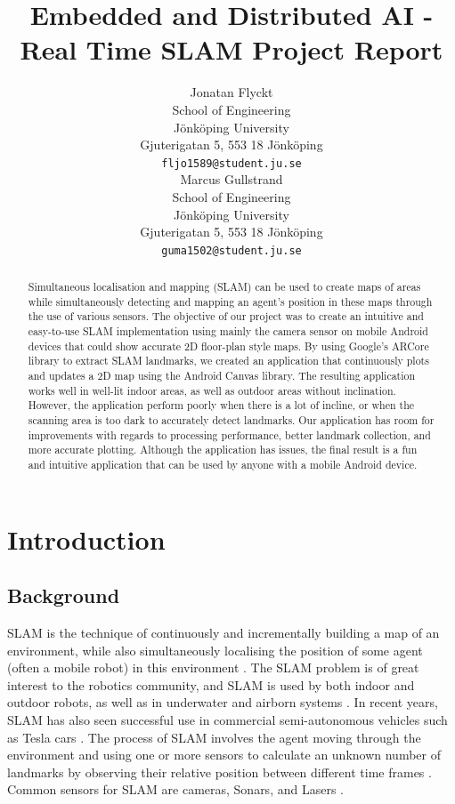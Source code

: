 \documentclass{article}
\title{Embedded and Distributed AI - Real Time SLAM Project Report}
\author{
 Jonatan Flyckt \\
  School of Engineering\\
  Jönköping University\\
  Gjuterigatan 5, 553 18 Jönköping \\
  \texttt{fljo1589@student.ju.se} \\
   \And
 Marcus Gullstrand \\
  School of Engineering\\
  Jönköping University\\
  Gjuterigatan 5, 553 18 Jönköping \\
  \texttt{guma1502@student.ju.se} \\
}
\begin{document}
\maketitle
\begin{abstract}

Simultaneous localisation and mapping (SLAM) can be used to create maps of areas while simultaneously detecting and mapping an agent's position in these maps through the use of various sensors. The objective of our project was to create an intuitive and easy-to-use SLAM implementation using mainly the camera sensor on mobile Android devices that could show accurate 2D floor-plan style maps. By using Google's ARCore library to extract SLAM landmarks, we created an application that continuously plots and updates a 2D map using the Android Canvas library. The resulting application works well in well-lit indoor areas, as well as outdoor areas without inclination. However, the application perform poorly when there is a lot of incline, or when the scanning area is too dark to accurately detect landmarks. Our application has room for improvements with regards to processing performance, better landmark collection, and more accurate plotting. Although the application has issues, the final result is a fun and intuitive application that can be used by anyone with a mobile Android device.

\end{abstract}

\section{Introduction}
\subsection{Background}

SLAM is the technique of continuously and incrementally building a map of an environment, while also simultaneously localising the position of some agent (often a mobile robot) in this environment \cite{background1}. The SLAM problem is of great interest to the robotics community, and SLAM is used by both indoor and outdoor robots, as well as in underwater and airborn systems \cite{background1}. In recent years, SLAM has also seen successful use in commercial semi-autonomous vehicles such as Tesla cars \cite{autonomous-cars}. The process of SLAM involves the agent moving through the environment and using one or more sensors to calculate an unknown number of landmarks by observing their relative position between different time frames \cite{background1}. Common sensors for SLAM are cameras, Sonars, and Lasers \cite{background2}.
\end{document}
